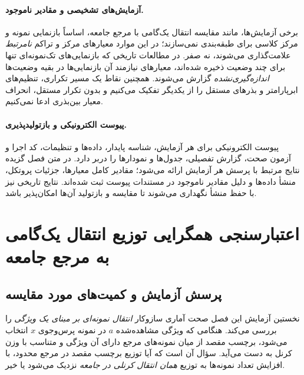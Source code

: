 \paragraph{آزمایش‌های تشخیصی و مقادیر ناموجود.}
برخی آزمایش‌ها، مانند مقایسه انتقال
یک‌گامی با مرجع جامعه، اساساً
بازنمایی نمونه و مرکز کلاسی برای
طبقه‌بندی نمی‌سازند؛ در این موارد
معیارهای مرکز و تراکم \emph{نامرتبط}
علامت‌گذاری می‌شوند، نه صفر.
در مطالعات تاریخی که بازنمایی‌های
تک‌نمونه‌ای تنها برای چند وضعیت
ذخیره شده‌اند، معیارهای نیازمند
آن بازنمایی‌ها در بقیه وضعیت‌ها
\emph{اندازه‌گیری‌نشده} گزارش می‌شوند.
همچنین نقاط یک مسیر تکراری، تنظیم‌های
ابرپارامتر و بذرهای مستقل را از یکدیگر
تفکیک می‌کنیم و بدون تکرار مستقل،
انحراف معیار بین‌بذری ادعا نمی‌کنیم.

\paragraph{پیوست الکترونیکی و بازتولیدپذیری.}
پیوست الکترونیکی برای هر آزمایش، شناسه پایدار،
داده‌ها و تنظیمات، کد اجرا و آزمون صحت،
گزارش تفصیلی، جدول‌ها و نمودارها را دربر دارد.
در متن فصل گزیده نتایج مرتبط با پرسش هر آزمایش
ارائه می‌شود؛ مقادیر کامل معیارها، جزئیات پروتکل،
منشأ داده‌ها و دلیل مقادیر ناموجود در مستندات پیوست
ثبت شده‌اند. نتایج تاریخی نیز با حفظ منشأ نگهداری
می‌شوند تا مقایسه و بازتولید آن‌ها امکان‌پذیر باشد.

\section{اعتبارسنجی همگرایی توزیع انتقال یک‌گامی به مرجع جامعه}
\label{sec:ch4-q-validation}

\subsection{پرسش آزمایش و کمیت‌های مورد مقایسه}
\label{subsec:ch4-q-question}
نخستین آزمایش این فصل صحت آماری سازوکار \emph{انتقال نمونه‌ای
بر مبنای یک ویژگی} را بررسی می‌کند. هنگامی که ویژگی
مشاهده‌شده $a$ در نمونه پرس‌وجوی $x$ انتخاب می‌شود،
برچسب مقصد از میان نمونه‌های مرجع دارای آن ویژگی
و متناسب با وزن کرنل به دست می‌آید. سؤال آن است که
آیا توزیع برچسب مقصد در مرجع محدود، با افزایش
تعداد نمونه‌ها به توزیع \emph{همان انتقال کرنلی در جامعه}
نزدیک می‌شود یا خیر.

